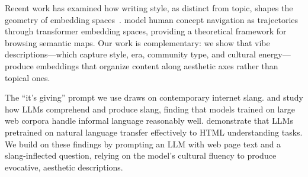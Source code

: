 Recent work has examined how writing style, as distinct from topic, shapes the geometry of embedding spaces~\cite{embedding_style2025}.
\citet{navigation2026} model human concept navigation as trajectories through transformer embedding spaces, providing a theoretical framework for browsing semantic maps.
Our work is complementary: we show that vibe descriptions---which capture style, era, community type, and cultural energy---produce embeddings that organize content along aesthetic axes rather than topical ones.

The ``it's giving'' prompt we use draws on contemporary internet slang.
\citet{slang2024} and \citet{wilson2024slang} study how LLMs comprehend and produce slang, finding that models trained on large web corpora handle informal language reasonably well.
\citet{gur2022understanding} demonstrate that LLMs pretrained on natural language transfer effectively to HTML understanding tasks.
We build on these findings by prompting an LLM with web page text and a slang-inflected question, relying on the model's cultural fluency to produce evocative, aesthetic descriptions.
